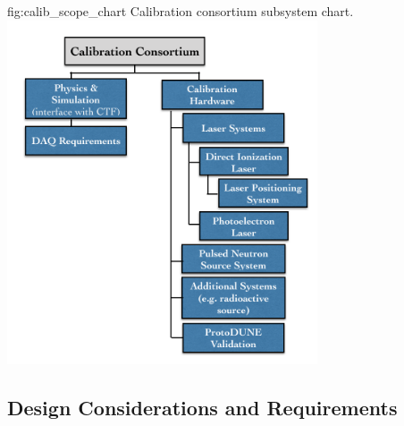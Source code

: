 


\begin{dunefigure}{fig:calib_scope_chart}
{Calibration consortium subsystem chart.}
\includegraphics[height=4.0in]{graphics/calib_scope_chart.png}
\end{dunefigure}


%


\subsection{Design Considerations and Requirements}
\label{sec:sp-calib-ov-consid}

